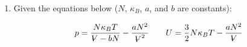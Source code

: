 \documentclass[10pt]{article}
\newenvironment{Solution}
    {\textbf{Solution:}
    
    \vspace{5mm}
    \begin{tcolorbox}
    }
    {
    \end{tcolorbox}
    \vspace{5mm}
    }
\newcommand{\vol}{{\ooalign{\hfil$V$\hfil\cr\kern0.08em--\hfil\cr}}}
\begin{document}
\begin{enumerate}
\begin{enumerate}
\begin{Solution}
    \end{Solution}

    \item Calculate the adiabatic compressibility (at constant $N$).
    
    \begin{Solution}    
    The adiabatic compressibility is given as,
    \begin{equation}
        \kappa_S = -\frac{1}{\vol}\left.\frac{\partial \vol}{\partial p}\right|_{S, N}
    \end{equation}
    The partial, $\left.\partial \vol/\partial p\right|_{S, N}$ is equivalent to $\left[\partial p/\partial \vol\right]_{S, N}^{-1}$, so
    \begin{equation}
        \left.\frac{\partial \vol}{\partial p}\right|_{S, N} = \left[-\beta\left(\beta-1\right) S^{\alpha} \vol^{\beta-2} N^\gamma \right]^{-1}
    \end{equation}
    Thus,
    \begin{align}
        \kappa_S &= -\frac{1}{\vol}\left.\frac{\partial \vol}{\partial p}\right|_{S, N} = -\frac{1}{\vol \left[-\beta\left(\beta-1\right) S^{\alpha} \vol^{\beta-2} N^\gamma \right]}\\
        &= \frac{-1}{-\beta\left(\beta-1\right)S^{\alpha} \vol^{\beta-1} N^\gamma}\\
        &\boxed{=\frac{-1}{p\left(\beta-1\right)}
        }
    \end{align}
    \end{Solution}
    
    \item Based on the sign of these response functions (assume $C_v \geq 0$, $\kappa_s \geq 0$, we will prove this later), find inequalities for $\alpha$ and $\beta$.
    
    \begin{Solution}    
    If $\kappa_s \geq 0$, then . If $C_v \geq 0$, then . 
    
    \end{Solution}

\end{enumerate}

\item Given the equations below ($N$, $\kappa_B$, $a$, and $b$ are constants):

\begin{equation}
    p = \frac{N\kappa_B T}{\vol -b N}-\frac{a N^2}{\vol^2} \qquad U = \frac{3}{2} N \kappa_B T - \frac{a N^2}{\vol}
\end{equation}


\end{enumerate}
\end{document}
